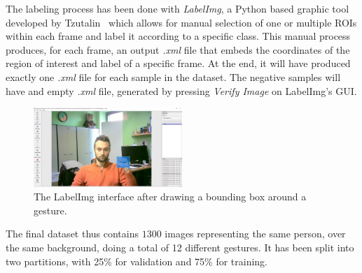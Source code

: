 \documentclass[10pt,twocolumn,letterpaper]{article}
\begin{document}
\begin{flushleft}
The labeling process has been done with \textit{LabelImg}, a Python based graphic tool developed by Tzutalin~\cite{tzutalin2015labelimg} which allows for manual selection of one or multiple ROIs within each frame and label it according to a specific class.
This manual process produces, for each frame, an output \textit{.xml} file that embeds the coordinates of the region of interest and label of a specific frame. At the end, it will have produced exactly one \textit{.xml} file for each sample in the dataset. The negative samples will have and empty \textit{.xml} file, generated by pressing \textit{Verify Image} on LabelImg's GUI.\linebreak

\begin{figure}[!h]
    \centering
    \includegraphics[width=0.5\textwidth]{resources/image/labelImgScreenshot.PNG} \caption{The LabelImg interface after drawing a bounding box around a gesture.}
\end{figure}

The final dataset thus contains $1300$ images representing the same person, over the same background, doing a total of 12 different gestures. It has been split into two partitions, with 25\% for validation and 75\% for training.
\end{flushleft}
\end{document}
